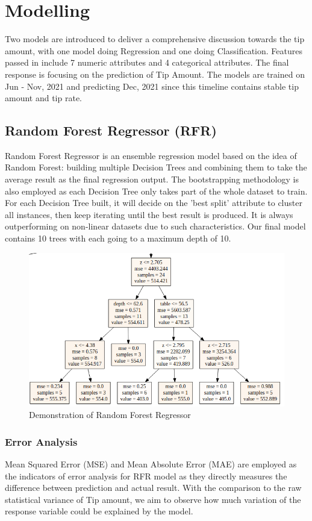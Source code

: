 \documentclass[11pt]{article}
\begin{document}
\section{Modelling}
Two models are introduced to deliver a comprehensive discussion towards the tip amount, with one model doing Regression and one doing Classification. Features passed in include 7 numeric attributes and 4 categorical attributes. The final response is focusing on the prediction of Tip Amount. The models are trained on Jun - Nov, 2021 and predicting Dec, 2021 since this timeline contains stable tip amount and tip rate.

\subsection{Random Forest Regressor (RFR)}
Random Forest Regressor\cite{5} is an ensemble regression model based on the idea of Random Forest: building multiple Decision Trees and combining them to take the average result as the final regression output. The bootstrapping methodology is also employed as each Decision Tree only takes part of the whole dataset to train. For each Decision Tree built, it will decide on the 'best split' attribute to cluster all instances, then keep iterating until the best result is produced. It is always outperforming on non-linear datasets due to such characteristics. Our final model contains 10 trees with each going to a maximum depth of 10.
\begin{figure}[h!]
     \centering
     \includegraphics[width=0.5\linewidth]{RFR model.png}
   \caption{Demonstration of Random Forest Regressor}
   \label{fig:5}
\end{figure}



\subsubsection{Error Analysis}
Mean Squared Error (MSE) and Mean Absolute Error (MAE) are employed as the indicators of error analysis for RFR model as they directly measures the difference between prediction and actual result. With the comparison to the raw statistical variance of Tip amount, we aim to observe how much variation of the response variable could be explained by the model.
\end{document}
